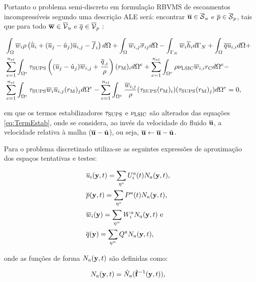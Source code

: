 \documentclass[_ArquivoPrincipal.tex]{subfiles}
\begin{document}
Portanto o problema semi-discreto em formulação RBVMS de escoamentos incompressíveis segundo uma descrição ALE será: encontrar $\overline{\mathbf{u}}\in\overline{\mathcal{S}}_u$ e $\overline{p}\in\overline{\mathcal{S}}_p$, tais que para todo $\overline{\mathbf{w}}\in\overline{\mathcal{V}}_u$ e $\overline{q}\in\overline{\mathcal{V}}_p$ \cite{bazilevs2013computational}:

\begin{equation}
    \begin{split}
        &\int_{\Omega}{\overline{w}_i\rho\left({\dot{\overline{u}}_i+(\overline{u}_j-\hat{u}_j)\overline{u}_{i,j}-\overline{f}_i}\right) d\Omega}+\int_{\Omega}{\overline{w}_{i,j}\overline{\sigma}_{ij} d\Omega}-\int_{\Gamma_N}{\overline{w}_i\overline{h}_i d\Gamma_N}+\int_{\Omega}{\overline{q}\overline{u}_{i,i} d\Omega}+\\
        &\sum_{e=1}^{n_{el}}{\int_{\Omega^e}{\tau_{\mathrm{SUPS}}\left({(\overline{u}_j-\hat{u}_j)\overline{w}_{i,j}+\frac{\overline{q}_{,i}}{\rho}}\right)(r_\mathrm{M})_{i} d\Omega^e}}+\sum_{e=1}^{n_{el}}{\int_{\Omega^e}{\rho\nu_{\mathrm{LSIC}}\overline{w}_{i,i}r_\mathrm{C} d\Omega^e}}-\\
        &\sum_{e=1}^{n_{el}}{\int_{\Omega^e}{\tau_{\mathrm{SUPS}}\overline{w}_i\overline{u}_{i,j}(r_\mathrm{M})_{j} d\Omega^e}}-\sum_{e=1}^{n_{el}}{\int_{\Omega^e}{\frac{\overline{w}_{i,j}}{\rho}(\tau_{\mathrm{SUPS}}(r_\mathrm{M})_{i})(\tau_{\mathrm{SUPS}}(r_\mathrm{M})_{j}) d\Omega^e}}=0
        \text{,}
        \label{eq:RBVMS-ALE}
    \end{split}
\end{equation}

\noindent em que os termos estabilizadores $\tau_{\mathrm{SUPS}}$ e $\nu_{\mathrm{LSIC}}$ são alterados das equações \ref{eq:TermEstab}, onde se considera, ao invés da velocidade do fluido $\overline{\mathbf{u}}$, a velocidade relativa à malha ($\overline{\mathbf{u}}-\hat{\mathbf{u}}$), ou seja, $\overline{\mathbf{u}}\gets\overline{\mathbf{u}}-\hat{\mathbf{u}}$.

Para o problema discretizado utiliza-se as seguintes expressões de aproximação dos espaços tentativas e testes:

\begin{subequations}
    \begin{align}
         & \overline{u}_i(\mathbf{y},t)=\sum_{\mathbf{\eta}^s}{U_i^a(t)N_a(\mathbf{y},t)}\text{,} \\
         & \overline{p}(\mathbf{y},t)=\sum_{\mathbf{\eta}^s}{P^a(t)N_a(\mathbf{y},t)}\text{,}     \\
         & \overline{w}_i(\mathbf{y})=\sum_{\mathbf{\eta}^w}{W_i^aN_a(\mathbf{y},t)}\text{ e}     \\
         & \overline{q}(\mathbf{y})=\sum_{\mathbf{\eta}^w}{Q^aN_a(\mathbf{y},t)}\text{,}
    \end{align}
\end{subequations}

\noindent onde as funções de forma $N_a(\mathbf{y},t)$ são definidas como:

\begin{equation}
    N_a(\mathbf{y},t)=\hat{N}_a(\hat{\mathbf{f}}^{-1}(\mathbf{y},t))\text{,}
\end{equation}
\end{document}
